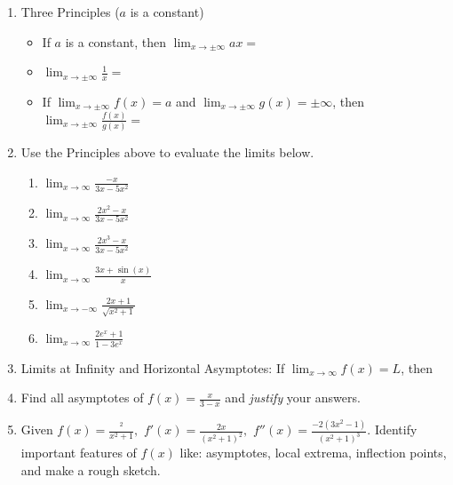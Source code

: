 \documentclass[11pt,fleqn]{article}
\begin{document}
\setlength{\parindent}{0cm}
\renewcommand{\headrulewidth}{0pt}
\newcommand{\blank}[1]{\rule{#1}{0.75pt}}
\renewcommand{\d}{\displaystyle}
\vspace*{-0.7in}
\begin{center}
 {\large{ }}
\end{center}
 \begin{enumerate}
 \item Three Principles ($a$ is a constant)
 \begin{itemize}
 	\item If $a$ is a constant, then $\displaystyle{\lim_{x \to \pm\infty} ax=}$
 	\item $\displaystyle{\lim_{x \to \pm\infty} \frac{1}{x}=}$
	\item If $\displaystyle{\lim_{x \to \pm\infty} f(x)=a}$ and $\displaystyle{\lim_{x \to \pm\infty} {g(x)}= \pm \infty}$, then  $\displaystyle{\lim_{x \to \pm\infty} \frac{f(x)}{g(x)}=}$
 \end{itemize}
 \item Use the Principles above to evaluate the limits below.
 	\begin{enumerate}
	\item $\displaystyle{\lim_{x \to \infty} \frac{-x}{3x-5x^2}}$
	\vfill
	\item $\displaystyle{\lim_{x \to \infty} \frac{2x^2-x}{3x-5x^2}}$
	\vfill
	\item $\displaystyle{\lim_{x \to \infty} \frac{2x^3-x}{3x-5x^2}}$
	\vfill
	\item $\displaystyle{\lim_{x \to \infty} \frac{3x+ \sin(x)}{x}}$
	\vfill
	\item $\displaystyle{\lim_{x \to -\infty} \frac{2x+1}{\sqrt{x^2+1}}}$
	\vfill
	\item $\displaystyle{\lim_{x \to \infty} \frac{2e^x+1}{1-3e^x}}$
	\vfill
		\end{enumerate}
 \newpage
 \item Limits at Infinity and Horizontal Asymptotes: If $\displaystyle{\lim_{x \to \infty}f(x) =L}$, then\\
 
 \item Find all asymptotes of $f(x)=\frac{x}{3-x}$ and \emph{justify} your answers.
 \vfill

 \item Given $f(x)=\frac{^2}{x^2+1},$ $f'(x)=\frac{2x}{(x^2+1)^2},$ $f''(x)= \frac{-2(3x^2-1)}{(x^2+1)^3}.$  Identify important features of $f(x)$ like: asymptotes, local extrema, inflection points, and make a rough sketch.
 \vfill
 \end{enumerate}
\end{document}
